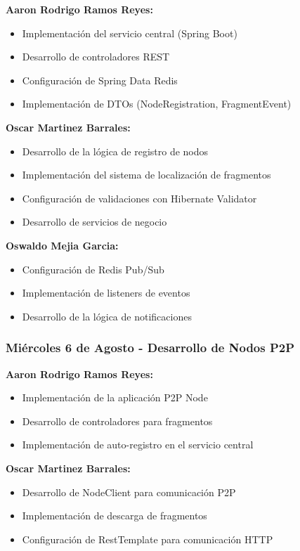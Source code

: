 \textbf{Aaron Rodrigo Ramos Reyes:}
\begin{itemize}
    \item Implementación del servicio central (Spring Boot)
    \item Desarrollo de controladores REST
    \item Configuración de Spring Data Redis
    \item Implementación de DTOs (NodeRegistration, FragmentEvent)
\end{itemize}

\textbf{Oscar Martinez Barrales:}
\begin{itemize}
    \item Desarrollo de la lógica de registro de nodos
    \item Implementación del sistema de localización de fragmentos
    \item Configuración de validaciones con Hibernate Validator
    \item Desarrollo de servicios de negocio
\end{itemize}

\textbf{Oswaldo Mejia Garcia:}
\begin{itemize}
    \item Configuración de Redis Pub/Sub
    \item Implementación de listeners de eventos
    \item Desarrollo de la lógica de notificaciones
\end{itemize}

\subsubsection*{Miércoles 6 de Agosto - Desarrollo de Nodos P2P}

\textbf{Aaron Rodrigo Ramos Reyes:}
\begin{itemize}
    \item Implementación de la aplicación P2P Node
    \item Desarrollo de controladores para fragmentos
    \item Implementación de auto-registro en el servicio central

\end{itemize}

\textbf{Oscar Martinez Barrales:}
\begin{itemize}
    \item Desarrollo de NodeClient para comunicación P2P
    \item Implementación de descarga de fragmentos
    \item Configuración de RestTemplate para comunicación HTTP
\end{itemize}

